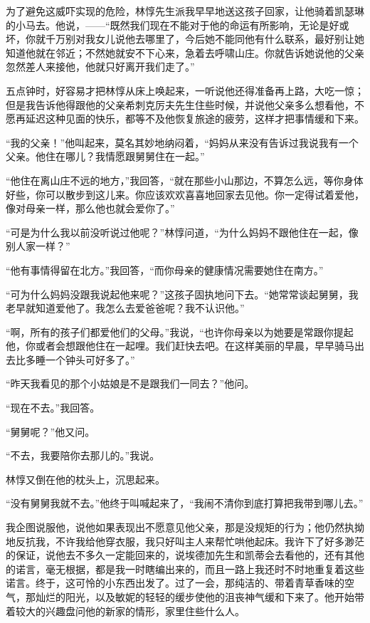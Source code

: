 \par 为了避免这威吓实现的危险，林惇先生派我早早地送这孩子回家，让他骑着凯瑟琳的小马去。他说，——“既然我们现在不能对于他的命运有所影响，无论是好或坏，你就千万别对我女儿说他去哪里了，今后她不能同他有什么联系，最好别让她知道他就在邻近；不然她就安不下心来，急着去呼啸山庄。你就告诉她说他的父亲忽然差人来接他，他就只好离开我们走了。”
\par 五点钟时，好容易才把林惇从床上唤起来，一听说他还得准备再上路，大吃一惊；但是我告诉他得跟他的父亲希刺克厉夫先生住些时候，并说他父亲多么想看他，不愿再延迟这种见面的快乐，都等不及他恢复旅途的疲劳，这样才把事情缓和下来。
\par “我的父亲！”他叫起来，莫名其妙地纳闷着，“妈妈从来没有告诉过我说我有一个父亲。他住在哪儿？我情愿跟舅舅住在一起。”
\par “他住在离山庄不远的地方，”我回答，“就在那些小山那边，不算怎么远，等你身体好些，你可以散步到这儿来。你应该欢欢喜喜地回家去见他。你一定得试着爱他，像对母亲一样，那么他也就会爱你了。”
\par “可是为什么我以前没听说过他呢？”林惇问道，“为什么妈妈不跟他住在一起，像别人家一样？”
\par “他有事情得留在北方。”我回答，“而你母亲的健康情况需要她住在南方。”
\par “可为什么妈妈没跟我说起他来呢？”这孩子固执地问下去。“她常常谈起舅舅，我老早就知道爱他了。我怎么去爱爸爸呢？我不认识他。”
\par “啊，所有的孩子们都爱他们的父母。”我说，“也许你母亲以为她要是常跟你提起他，你或者会想跟他住在一起哩。我们赶快去吧。在这样美丽的早晨，早早骑马出去比多睡一个钟头可好多了。”
\par “昨天我看见的那个小姑娘是不是跟我们一同去？”他问。
\par “现在不去。”我回答。
\par “舅舅呢？”他又问。
\par “不去，我要陪你去那儿的。”我说。
\par 林惇又倒在他的枕头上，沉思起来。
\par “没有舅舅我就不去。”他终于叫喊起来了，“我闹不清你到底打算把我带到哪儿去。”
\par 我企图说服他，说他如果表现出不愿意见他父亲，那是没规矩的行为；他仍然执拗地反抗我，不许我给他穿衣服，我只好叫主人来帮忙哄他起床。我许下了好多渺茫的保证，说他去不多久一定能回来的，说埃德加先生和凯蒂会去看他的，还有其他的诺言，毫无根据，都是我一时瞎编出来的，而且一路上我还时不时地重复着这些诺言。终于，这可怜的小东西出发了。过了一会，那纯洁的、带着青草香味的空气，那灿烂的阳光，以及敏妮的轻轻的缓步使他的沮丧神气缓和下来了。他开始带着较大的兴趣盘问他的新家的情形，家里住些什么人。
